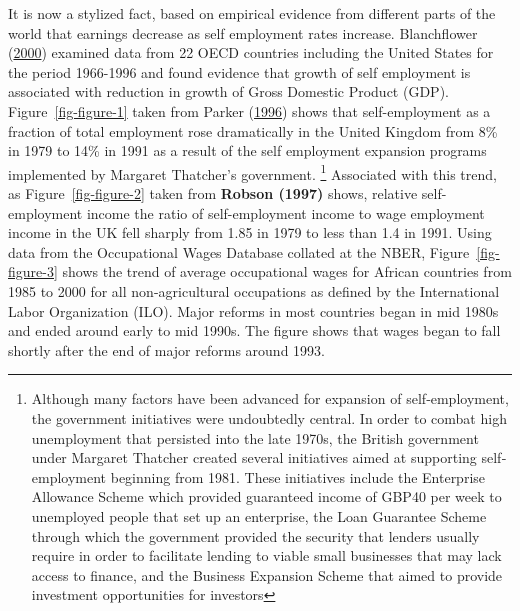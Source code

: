 \documentclass[
  a4paper,
  DIV=11,
  numbers=noendperiod]{scrartcl}
\begin{document}
It is now a stylized fact, based on empirical evidence from different
parts of the world that earnings decrease as self employment rates
increase. Blanchflower (\protect\hyperlink{ref-blanchflower2000}{2000})
examined data from 22 OECD countries including the United States for the
period 1966-1996 and found evidence that growth of self employment is
associated with reduction in growth of Gross Domestic Product (GDP).
Figure~\ref{fig-figure-1} taken from Parker
(\protect\hyperlink{ref-parker1996}{1996}) shows that self-employment as
a fraction of total employment rose dramatically in the United Kingdom
from 8\% in 1979 to 14\% in 1991 as a result of the self employment
expansion programs implemented by Margaret Thatcher's government.
\footnote{Although many factors have been advanced for expansion of
  self‐employment, the government initiatives were undoubtedly central.
  In order to combat high unemployment that persisted into the late
  1970s, the British government under Margaret Thatcher created several
  initiatives aimed at supporting self‐employment beginning from 1981.
  These initiatives include the Enterprise Allowance Scheme which
  provided guaranteed income of GBP40 per week to unemployed people that
  set up an enterprise, the Loan Guarantee Scheme through which the
  government provided the security that lenders usually require in order
  to facilitate lending to viable small businesses that may lack access
  to finance, and the Business Expansion Scheme that aimed to provide
  investment opportunities for investors} Associated with this trend, as
Figure~\ref{fig-figure-2} taken from \textbf{Robson (1997)} shows,
relative self-employment income the ratio of self-employment income to
wage employment income in the UK fell sharply from 1.85 in 1979 to less
than 1.4 in 1991. Using data from the Occupational Wages Database
collated at the NBER, Figure~\ref{fig-figure-3} shows the trend of
average occupational wages for African countries from 1985 to 2000 for
all non-agricultural occupations as defined by the International Labor
Organization (ILO). Major reforms in most countries began in mid 1980s
and ended around early to mid 1990s. The figure shows that wages began
to fall shortly after the end of major reforms around 1993.
\end{document}
